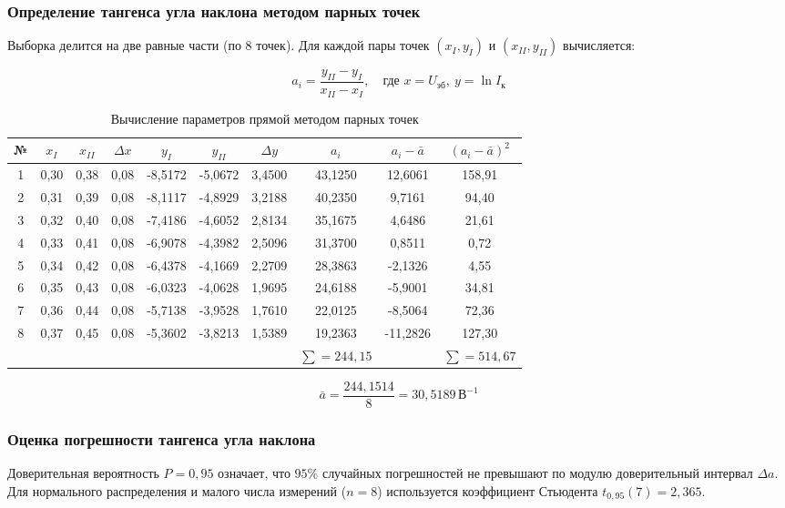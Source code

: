 \documentclass[a4paper,14pt]{extarticle}
\theoremstyle{plain}
\theoremstyle{remark}
\theoremstyle{definition}
\begin{document}
\subsubsection{ Определение тангенса угла наклона методом парных точек}

Выборка делится на две равные части (по 8 точек). Для каждой пары точек $(x_I, y_I)$ и $(x_{II}, y_{II})$ вычисляется:

\[
a_i = \frac{y_{II} - y_I}{x_{II} - x_I}, \quad \text{где } x = U_{\text{эб}}, \ y = \ln I_{\text{к}}
\]
\begin{table}[H]
\centering
\caption{Вычисление параметров прямой методом парных точек}
\begin{tabular}{|c|c|c|c|c|c|c|c|c|c|}
\hline
№ & $x_I$ & $x_{II}$ & $\Delta x$ & $y_I$ & $y_{II}$ & $\Delta y$ & $a_i$ & $a_i-\bar{a}$ & $(a_i-\bar{a})^2$ \\
\hline
1 & 0,30 & 0,38 & 0,08 & -8,5172 & -5,0672 & 3,4500 & 43,1250 & 12,6061 & 158,91 \\
2 & 0,31 & 0,39 & 0,08 & -8,1117 & -4,8929 & 3,2188 & 40,2350 & 9,7161 & 94,40 \\
3 & 0,32 & 0,40 & 0,08 & -7,4186 & -4,6052 & 2,8134 & 35,1675 & 4,6486 & 21,61 \\
4 & 0,33 & 0,41 & 0,08 & -6,9078 & -4,3982 & 2,5096 & 31,3700 & 0,8511 & 0,72 \\
5 & 0,34 & 0,42 & 0,08 & -6,4378 & -4,1669 & 2,2709 & 28,3863 & -2,1326 & 4,55 \\
6 & 0,35 & 0,43 & 0,08 & -6,0323 & -4,0628 & 1,9695 & 24,6188 & -5,9001 & 34,81 \\
7 & 0,36 & 0,44 & 0,08 & -5,7138 & -3,9528 & 1,7610 & 22,0125 & -8,5064 & 72,36 \\
8 & 0,37 & 0,45 & 0,08 & -5,3602 & -3,8213 & 1,5389 & 19,2363 & -11,2826 & 127,30 \\
\hline
\multicolumn{7}{|c|}{} &\multicolumn{1}{|c|}{$\sum = 244,15$} & \multicolumn{1}{|c|}{} & \multicolumn{1}{|c|}{$\sum = 514,67$} \\
\hline
\end{tabular}
\end{table}

\[
\bar{a} = \frac{244,1514}{8} = 30,5189 \, \text{В}^{-1}
\]
\subsubsection{Оценка погрешности тангенса угла наклона}

Доверительная вероятность $P = 0,95$ означает, что $95\%$ случайных погрешностей не превышают по модулю доверительный интервал $\Delta a$. Для нормального распределения и малого числа измерений ($n = 8$) используется коэффициент Стьюдента $t_{0,95}(7) = 2,365$.
\end{document}
